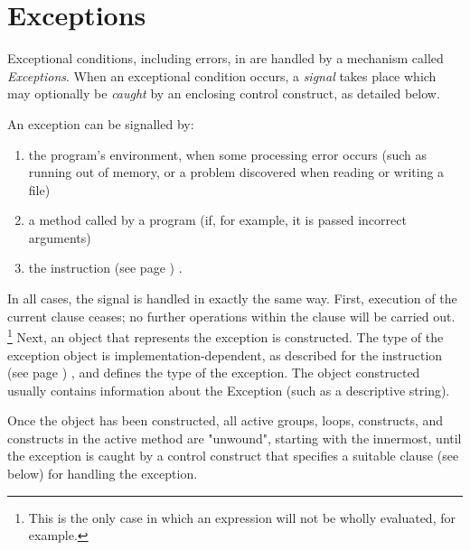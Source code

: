 \chapter{Exceptions}\label{refexcep}
 
Exceptional conditions, including errors, in \nr{} are handled by a
mechanism called \emph{Exceptions}.
When an exceptional condition occurs, a \emph{signal} takes place
which may optionally be \emph{caught} by an enclosing control
construct, as detailed below.
 
An exception can be signalled by:
\begin{enumerate}
\item the program's environment, when some processing error occurs (such
as running out of memory, or a problem discovered when reading or
writing a file)
\item a method called by a \nr{} program (if, for example, it is passed
incorrect arguments)
\item the   instruction (see page \pageref{refsignal}) .
\end{enumerate}
In all cases, the signal is handled in exactly the same way.
First, execution of the current clause ceases; no further operations
within the clause will be carried out.
\footnote{
This is the only case in which an expression will not be wholly
evaluated, for example.
}
Next, an object that represents the exception is constructed.  The type
of the exception object is implementation-dependent, as described for
the   instruction (see page \pageref{refsignal}) , and defines the
type of the exception.  The object constructed usually contains
information about the Exception (such as a descriptive string).
 
Once the object has been constructed, all active  groups,
 loops,  constructs, and 
constructs in the active method are "unwound", starting with the
innermost, until the exception is caught by a control construct that
specifies a suitable  clause (see below) for handling the
exception.
 
